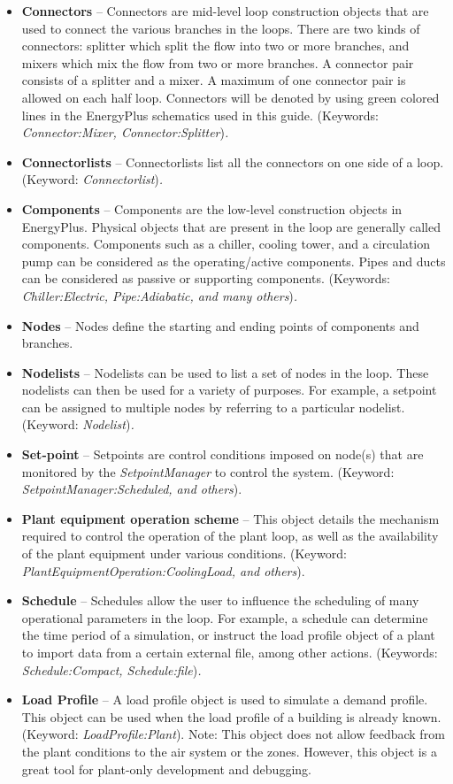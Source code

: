 \begin{itemize}
\item
  \textbf{Connectors} -- Connectors are mid-level loop construction objects that are used to connect the various branches in the loops. There are two kinds of connectors: splitter which split the flow into two or more branches, and mixers which mix the flow from two or more branches. A connector pair consists of a splitter and a mixer. A maximum of one connector pair is allowed on each half loop. Connectors will be denoted by using green colored lines in the EnergyPlus schematics used in this guide. (Keywords: \emph{Connector:Mixer, Connector:Splitter})\emph{.}
\item
  \textbf{Connectorlists} -- Connectorlists list all the connectors on one side of a loop. (Keyword: \emph{Connectorlist})\emph{.}
\item
  \textbf{Components} -- Components are the low-level construction objects in EnergyPlus. Physical objects that are present in the loop are generally called components. Components such as a chiller, cooling tower, and a circulation pump can be considered as the operating/active components. Pipes and ducts can be considered as passive or supporting components. (Keywords: \emph{Chiller:Electric, Pipe:Adiabatic, and many others})\emph{.}
\item
  \textbf{Nodes} -- Nodes define the starting and ending points of components and branches.
\item
  \textbf{Nodelists} -- Nodelists can be used to list a set of nodes in the loop. These nodelists can then be used for a variety of purposes. For example, a setpoint can be assigned to multiple nodes by referring to a particular nodelist. (Keyword: \emph{Nodelist})\emph{.}
\item
  \textbf{Set-point} -- Setpoints are control conditions imposed on node(s) that are monitored by the \emph{SetpointManager} to control the system. (Keyword: \emph{SetpointManager:Scheduled, and others}).
\item
  \textbf{Plant equipment operation scheme} -- This object details the mechanism required to control the operation of the plant loop, as well as the availability of the plant equipment under various conditions. (Keyword: \emph{PlantEquipmentOperation:CoolingLoad, and others}).
\item
  \textbf{Schedule} -- Schedules allow the user to influence the scheduling of many operational parameters in the loop. For example, a schedule can determine the time period of a simulation, or instruct the load profile object of a plant to import data from a certain external file, among other actions. (Keywords: \emph{Schedule:Compact, Schedule:file})\emph{.}
\item
  \textbf{Load Profile} -- A load profile object is used to simulate a demand profile. This object can be used when the load profile of a building is already known. (Keyword: \emph{LoadProfile:Plant}). Note: This object does not allow feedback from the plant conditions to the air system or the zones. However, this object is a great tool for plant-only development and debugging.
\end{itemize}
